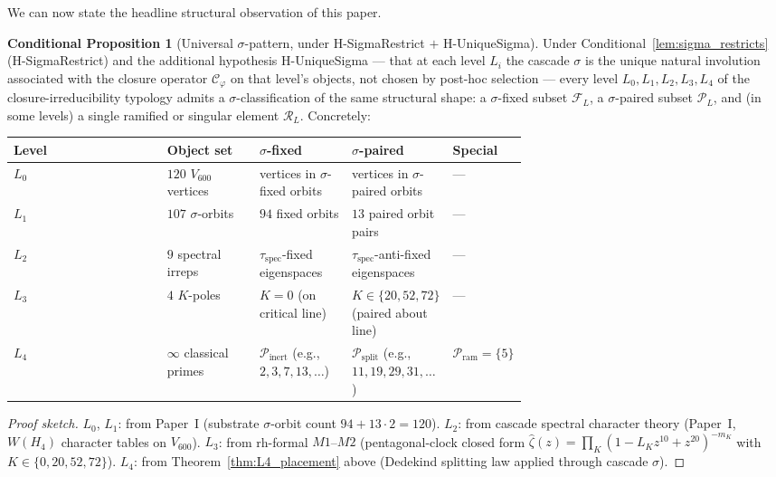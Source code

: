 \documentclass[11pt,a4paper]{article}
\theoremstyle{definition}
\newtheorem{conditional}[theorem]{Conditional Proposition}
\theoremstyle{remark}
\begin{document}
We can now state the headline structural observation of this paper.

\begin{conditional}[Universal $\sigma$-pattern, under H-SigmaRestrict $+$ H-UniqueSigma]\label{thm:universal}
Under Conditional~\ref{lem:sigma_restricts} (H-SigmaRestrict) and the
additional hypothesis H-UniqueSigma --- that at each level $L_i$ the
cascade $\sigma$ is the unique natural involution associated with the
closure operator $\mathcal{C}_\varphi$ on that level's objects, not
chosen by post-hoc selection --- every level $L_0, L_1, L_2, L_3, L_4$
of the closure-irreducibility typology admits a $\sigma$-classification
of the same structural shape: a $\sigma$-fixed subset $\mathcal{F}_L$,
a $\sigma$-paired subset $\mathcal{P}_L$, and (in some levels) a single
ramified or singular element $\mathcal{R}_L$. Concretely:
\end{conditional}

\begin{center}\small
\begin{tabular}{lp{0.18\linewidth}p{0.18\linewidth}p{0.18\linewidth}p{0.12\linewidth}}\toprule
Level & Object set & $\sigma$-fixed & $\sigma$-paired & Special \\\midrule
$L_0$ & $120$ $V_{600}$ vertices & vertices in $\sigma$-fixed orbits & vertices in $\sigma$-paired orbits & --- \\
$L_1$ & $107$ $\sigma$-orbits & $94$ fixed orbits & $13$ paired orbit pairs & --- \\
$L_2$ & $9$ spectral irreps & $\tau_{\mathrm{spec}}$-fixed eigenspaces & $\tau_{\mathrm{spec}}$-anti-fixed eigenspaces & --- \\
$L_3$ & $4$ $K$-poles & $K = 0$ (on critical line) & $K \in \{20, 52, 72\}$ (paired about line) & --- \\
$L_4$ & $\infty$ classical primes & $\mathcal{P}_{\mathrm{inert}}$ (e.g., $2, 3, 7, 13, \ldots$) & $\mathcal{P}_{\mathrm{split}}$ (e.g., $11, 19, 29, 31, \ldots$) & $\mathcal{P}_{\mathrm{ram}} = \{5\}$ \\
\bottomrule\end{tabular}
\end{center}

\begin{proof}[Proof sketch]
$L_0$, $L_1$: from Paper~I (substrate $\sigma$-orbit count $94 + 13 \cdot 2 = 120$).
$L_2$: from cascade spectral character theory (Paper~I, $W(H_4)$
character tables on $V_{600}$).
$L_3$: from rh-formal $M1$--$M2$ (pentagonal-clock closed form
$\hat{\zeta}(z) = \prod_K (1 - L_K z^{10} + z^{20})^{-m_K}$ with
$K \in \{0, 20, 52, 72\}$).
$L_4$: from Theorem~\ref{thm:L4_placement} above (Dedekind splitting
law applied through cascade $\sigma$).
\end{proof}
\end{document}
